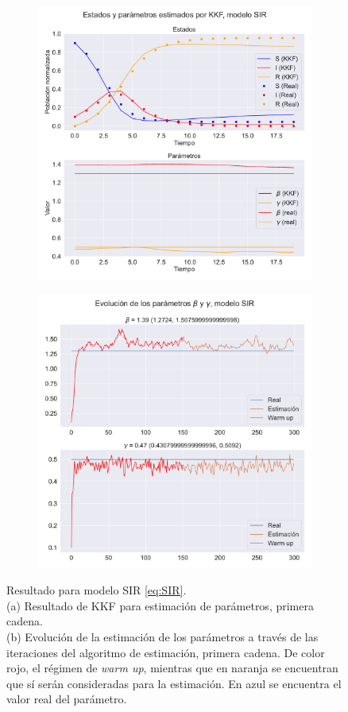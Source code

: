 \begin{figure}[h!]
    \centering
    \begin{subfigure}[b]{0.49\textwidth}
    \centering
         \includegraphics[width=0.8\linewidth]{img/content/chapter4/nonlinear_filters_sir_params.pdf}
    \caption{}
    \end{subfigure}
   \begin{subfigure}[b]{0.49\textwidth}
   \centering
       \includegraphics[width=0.8\linewidth]{img/content/chapter4/nonlinear_filters_sir_params_evolution.pdf}
       \caption{}
   \end{subfigure}
    \caption{Resultado para modelo SIR \eqref{eq:SIR}. \\
    (a) Resultado de KKF para estimación de parámetros, primera cadena. \\
    (b) Evolución de la estimación de los parámetros a través de las iteraciones del algoritmo de estimación, primera cadena. De color rojo, el régimen de \textit{warm up}, mientras que en naranja se encuentran que sí serán consideradas para la estimación. En azul se encuentra el valor real del parámetro.}
    \label{fig:param_estim_SIR}
\end{figure}

